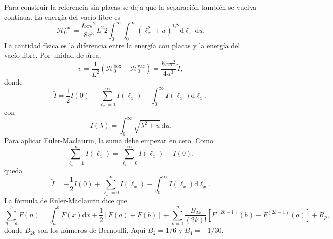 \documentclass[11pt]{article}
\newcommand{\dd}{\mathrm{d}}
\begin{document}
Para construir la referencia sin placas se deja que la separaci\'on tambi\'en
se vuelva continua. La energ\'ia del vac\'io libre es
\begin{equation}
  \mathcal H_0^{\mathrm{vac}}
  =
  \frac{\hbar c\pi^2}{8a^3}L^2
  2\int_0^\infty\int_0^\infty
  (\ell_x^2+u)^{1/2}\dd \ell_x\,\dd u.
\end{equation}
La cantidad f\'isica es la diferencia entre la energ\'ia con placas y la
energ\'ia del vac\'io libre. Por unidad de \'area,
\begin{equation}
  v
  =
  \frac{1}{L^2}
  \left(
  \mathcal H_0^{\mathrm{box}}
  -
  \mathcal H_0^{\mathrm{vac}}
  \right)
  =
  \frac{\hbar c\pi^2}{4a^3}\,\tilde I,
\end{equation}
donde
\begin{equation}
  \tilde I
  =
  \frac{1}{2}I(0)
  +
  \sum_{\ell_x=1}^{\infty}I(\ell_x)
  -
  \int_0^\infty I(\ell_x)\dd\ell_x,
\end{equation}
con
\begin{equation}
  I(\lambda)
  =
  \int_0^\infty
  \sqrt{\lambda^2+u}\,\dd u.
\end{equation}
Para aplicar Euler-Maclaurin, la suma debe empezar en cero. Como
\begin{equation}
  \sum_{\ell_x=1}^{\infty}I(\ell_x)
  =
  \sum_{\ell_x=0}^{\infty}I(\ell_x)-I(0),
\end{equation}
queda
\begin{equation}
  \tilde I
  =
  -\frac{1}{2}I(0)
  +
  \sum_{\ell_x=0}^{\infty}I(\ell_x)
  -
  \int_0^\infty I(\ell_x)\dd\ell_x.
\end{equation}
La f\'ormula de Euler-Maclaurin dice que
\begin{equation}
  \sum_{n=a}^{b}F(n)
  =
  \int_a^bF(x)\dd x
  +
  \frac{1}{2}[F(a)+F(b)]
  +
  \sum_{k=1}^{p}
  \frac{B_{2k}}{(2k)!}
  [F^{(2k-1)}(b)-F^{(2k-1)}(a)]
  +
  R_p,
\end{equation}
donde $B_{2k}$ son los n\'umeros de Bernoulli. Aqu\'i
$B_2=1/6$ y $B_4=-1/30$.
\end{document}
